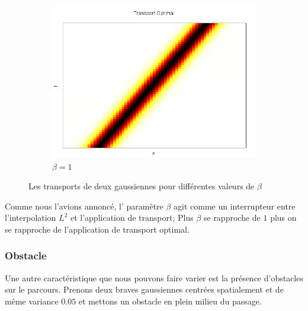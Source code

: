\documentclass[a4paper,12pt]{article}
\begin{document}
\begin{figure}[!h]
	\begin{subfigure}[b]{0.48\linewidth}
	\includegraphics[width=\textwidth]{img/1DGeneralise/transport100.png}
	\caption{$\beta = 1$}
	\end{subfigure}	
	\caption{Les transports de deux gaussiennes pour différentes valeurs de $\beta$}
\end{figure}

Comme nous l'avions annoncé, l' paramètre $\beta$ agit comme un interrupteur entre l'interpolation $L^2$ et l'application de transport; Plus $\beta$ se rapproche de $1$ plus on se rapproche de l'application de transport optimal. 

\newpage
\subsubsection{Obstacle}

Une autre caractéristique que nous pouvons faire varier est la présence d'obstacles sur le parcours. Prenons deux braves gaussiennes centrées spatialement et de même variance $0.05$ et mettons un obstacle en plein milieu du passage. 
\end{document}
